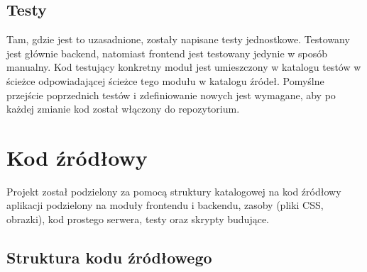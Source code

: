 \documentclass[a4paper,twoside,openright,11pt]{report}
\begin{document}
  \section{Testy}
\par Tam, gdzie jest to uzasadnione, zostały napisane testy jednostkowe. Testowany jest głównie backend, natomiast frontend jest testowany jedynie w sposób manualny.  Kod testujący konkretny moduł jest umieszczony w katalogu testów w ścieżce odpowiadającej ścieżce tego modułu w katalogu źródeł. Pomyślne przejście poprzednich testów i zdefiniowanie nowych jest wymagane, aby po każdej zmianie kod został włączony do repozytorium.

  \chapter {Kod źródłowy}
\par Projekt został podzielony za pomocą struktury katalogowej na kod źródłowy aplikacji podzielony na moduły frontendu i backendu, zasoby (pliki CSS, obrazki), kod prostego serwera, testy oraz skrypty budujące.

  \section{Struktura kodu źródłowego}
\end{document}
